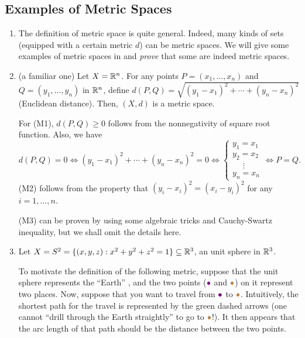 \subsection{Examples of Metric Spaces}
\label{subsect:metric-sp-eg}
\begin{enumerate}
\item The definition of metric space is quite general. Indeed, many kinds of
sets (equipped with a certain metric \(d\)) can be metric spaces. We will give
some examples of metric spaces in  and \emph{prove}
that some are indeed metric spaces.

\item \label{it:metric-rn}
(a familiar one) Let \(X=\mathbb{R}^n\). For any points \(P=(x_1,\dotsc,x_n)\)
and \(Q=(y_1,\dotsc,y_n)\) in \(\mathbb{R}^n\), define
\(d(P,Q)=\sqrt{(y_1-x_1)^{2}+\dotsb+(y_n-x_n)^{2}}\) (Euclidean distance).
Then, \((X,d)\) is a metric space.

\begin{pf}
For (M1), \(d(P,Q)\ge 0\) follows from the nonnegativity of square root
function. Also, we have
\[
d(P,Q)=0\iff (y_1-x_1)^{2}+\dotsb+(y_n-x_n)^{2}=0
\iff \begin{cases}
y_1=x_1\\
y_2=x_2\\
\quad\;\vdots\\
y_n=x_n
\end{cases}
\iff
P=Q.
\]
(M2) follows from the property that \((y_i-x_i)^{2}=(x_i-y_i)^{2}\) for any
\(i=1,\dotsc,n\).

(M3) can be proven by using some algebraic tricks and Cauchy-Swartz inequality,
but we shall omit the details here.
\end{pf}

\item Let \(X=S^2=\{(x,y,z):x^2+y^2+z^2=1\}\subseteq\mathbb{R}^3\), an unit sphere in
\(\mathbb{R}^3\).

To motivate the definition of the following metric, suppose that the unit
sphere represents the ``Earth'' , and the two points
(\({\color{violet}\bullet}\) and \({\color{brown}\bullet}\)) on it represent
two places. Now, suppose that you want to travel  from
\({\color{violet}\bullet}\) to \({\color{brown}\bullet}\). Intuitively, the
shortest path for the travel is represented by the {\color{green!50!black}green
dashed arrows} (one cannot ``drill through the Earth straightly'' to go to
\({\color{brown}\bullet}\)!). It then appears that the arc length of that path
should be the distance between the two points.


\end{enumerate}
